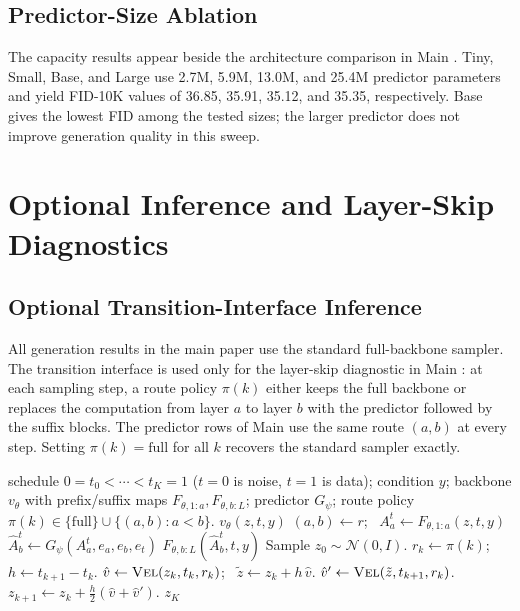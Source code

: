 \subsection{Predictor-Size Ablation}
\label{app:predictor_size_ablation}

The capacity results appear beside the architecture comparison in Main . Tiny, Small, Base, and Large use 2.7M, 5.9M, 13.0M, and 25.4M predictor parameters and yield FID-10K values of 36.85, 35.91, 35.12, and 35.35, respectively. Base gives the lowest FID among the tested sizes; the larger predictor does not improve generation quality in this sweep.

\section{Optional Inference and Layer-Skip Diagnostics}
\label{app:optional_inference_diagnostics}

\subsection{Optional Transition-Interface Inference}
\label{app:optional_transition_inference}

All generation results in the main paper use the standard full-backbone sampler. The transition interface is used only for the layer-skip diagnostic in Main : at each sampling step, a route policy $\pi(k)$ either keeps the full backbone or replaces the computation from layer $a$ to layer $b$ with the predictor followed by the suffix blocks. The predictor rows of Main  use the same route $(a,b)$ at every step. Setting $\pi(k)=\mathrm{full}$ for all $k$ recovers the standard sampler exactly.

\begin{algorithm}[!htbp]
\caption{\textbf{Optional transition-interface Heun sampler.}}
\label{alg:realign_inference}
\small
\begin{algorithmic}[1]
\Require schedule $0=t_0<\cdots<t_K=1$ ($t=0$ is noise, $t=1$ is data); condition $y$; backbone $v_\theta$ with prefix/suffix maps $F_{\theta,1:a},F_{\theta,b:L}$; predictor $G_\psi$; route policy $\pi(k)\in\{\mathrm{full}\}\cup\{(a,b):a<b\}$.
        \State \Return $v_\theta(z,t,y)$
    \EndIf
    \State $(a,b)\gets r$; \ $A_a^{t}\gets F_{\theta,1:a}(z,t,y)$
    \State $\widehat A_b^{t}\gets G_\psi(A_a^{t},e_a,e_b,e_t)$
    \State \Return $F_{\theta,b:L}(\widehat A_b^{t},t,y)$
\EndFunction
\State Sample $z_0\sim\mathcal{N}(0,I)$.
    \State $r_k\gets\pi(k)$; \ $h\gets t_{k+1}-t_k$.
    \State $\hat v\gets\Call{Vel}{z_k,t_k,r_k}$; \ $\tilde z\gets z_k+h\,\hat v$.
    \State $\hat v'\gets\Call{Vel}{\tilde z,t_{k+1},r_k}$.
    \State $z_{k+1}\gets z_k+\tfrac{h}{2}\left(\hat v+\hat v'\right)$.
\EndFor
\State \Return $z_K$
\end{algorithmic}
\end{algorithm}

